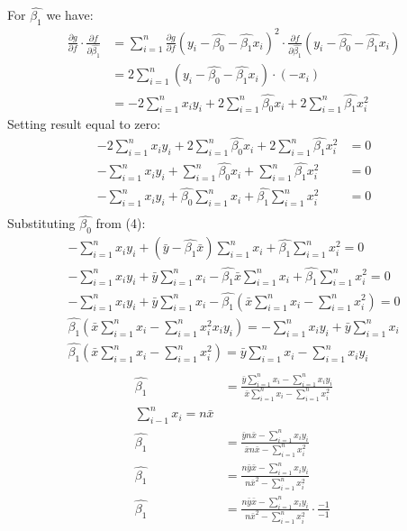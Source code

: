 \documentclass{article}
\begin{document}
For $\hat{\beta_1}$ we have:
\begin{align*}
\frac{\partial g}{\partial f}\cdot\frac{\partial f} {\partial \hat{\beta_1}} & = 
\sum_{i=1}^{n} \frac{\partial g}{\partial f} (y_i - \hat{\beta_{0}} - \hat{\beta_{1}}x_i)^2 \cdot \frac{\partial f} {\partial \hat{\beta_1}} (y_i - \hat{\beta_{0}} - \hat{\beta_{1}}x_i) \\
& = 2 \sum_{i=1}^{n} (y_i - \hat{\beta_{0}} - \hat{\beta_{1}}x_i) \cdot 
(-x_i) \\
& =  -2\sum_{i=1}^{n}x_i y_i + 2\sum_{i=1}^{n}\hat{\beta_{0}}x_i + 2\sum_{i=1}^{n}\hat{\beta_{1}}x_i^2
\end{align*}
Setting result equal to zero:
\begin{align*}
-2\sum_{i=1}^{n}x_i y_i + 2\sum_{i=1}^{n}\hat{\beta_{0}}x_i + 2\sum_{i=1}^{n}\hat{\beta_{1}}x_i^2 & = 0 \\
-\sum_{i=1}^{n}x_i y_i + \sum_{i=1}^{n}\hat{\beta_{0}}x_i + \sum_{i=1}^{n}\hat{\beta_{1}}x_i^2 & = 0 \\
-\sum_{i=1}^{n}x_i y_i + \hat{\beta_{0}}\sum_{i=1}^{n}x_i + \hat{\beta_{1}} \sum_{i=1}^{n}x_i^2 & = 0 \\
\end{align*}
Substituting $\hat{\beta_0}$ from (4):
\begin{gather*}
-\sum_{i=1}^{n}x_i y_i + (\bar{y} - \hat{\beta_1}\bar{x})\sum_{i=1}^{n}x_i + \hat{\beta_{1}} \sum_{i=1}^{n}x_i^2  = 0 \\
-\sum_{i=1}^{n}x_i y_i + \bar{y}\sum_{i=1}^{n}x_i - \hat{\beta_1}\bar{x}\sum_{i=1}^{n}x_i + \hat{\beta_{1}} \sum_{i=1}^{n}x_i^2  = 0 \\
-\sum_{i=1}^{n}x_i y_i + \bar{y}\sum_{i=1}^{n}x_i - \hat{\beta_1}(\bar{x}\sum_{i=1}^{n}x_i - \sum_{i=1}^{n}x_i^2)  = 0 \\
\hat{\beta_1}(\bar{x}\sum_{i=1}^{n}x_i - \sum_{i=1}^{n}x_i^2x_i y_i ) = -\sum_{i=1}^{n}x_i y_i  + \bar{y}\sum_{i=1}^{n}x_i \\
\hat{\beta_1}(\bar{x}\sum_{i=1}^{n}x_i - \sum_{i=1}^{n}x_i^2) =  \bar{y}\sum_{i=1}^{n}x_i 
- \sum_{i=1}^{n}x_i y_i \\
\end{gather*}
\begin{align*}
\hat{\beta_1} & =  \frac{\bar{y}\sum_{i=1}^{n}x_i 
- \sum_{i=1}^{n}x_i y_i }{\bar{x}\sum_{i=1}^{n}x_i - \sum_{i=1}^{n}x_i^2}  \\
\sum_{i - 1}^{n}x_i = n\bar{x}\\
\hat{\beta_1} & =  \frac{\bar{y}n\bar{x} 
- \sum_{i=1}^{n}x_i y_i }{\bar{x}n\bar{x} - \sum_{i=1}^{n}x_i^2}  \\
\hat{\beta_1} & =  \frac{n\bar{y}\bar{x} 
- \sum_{i=1}^{n}x_i y_i }{n\bar{x}^2 - \sum_{i=1}^{n}x_i^2} \\
\hat{\beta_1} & =  \frac{n\bar{y}\bar{x} 
- \sum_{i=1}^{n}x_i y_i}{n\bar{x}^2 - \sum_{i=1}^{n}x_i^2} \cdot \frac{-1}{-1 } \\
\end{align*}
\end{document}
